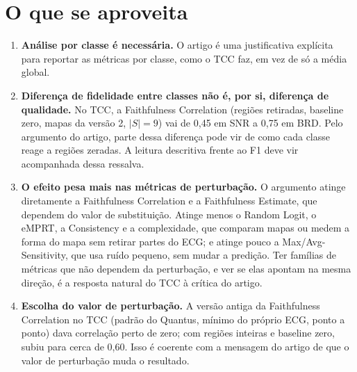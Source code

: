 \documentclass[11pt,a4paper]{article}
\begin{document}
\section{O que se aproveita}
\begin{enumerate}
\item \textbf{Análise por classe é necessária.} O artigo é uma justificativa explícita para reportar as métricas por classe, como o TCC faz, em vez de só a média global.
\item \textbf{Diferença de fidelidade entre classes não é, por si, diferença de qualidade.} No TCC, a Faithfulness Correlation (regiões retiradas, baseline zero, mapas da versão 2, $|S| = 9$) vai de 0,45 em SNR a 0,75 em BRD. Pelo argumento do artigo, parte dessa diferença pode vir de como cada classe reage a regiões zeradas. A leitura descritiva frente ao F1 deve vir acompanhada dessa ressalva.
\item \textbf{O efeito pesa mais nas métricas de perturbação.} O argumento atinge diretamente a Faithfulness Correlation e a Faithfulness Estimate, que dependem do valor de substituição. Atinge menos o Random Logit, o eMPRT, a Consistency e a complexidade, que comparam mapas ou medem a forma do mapa sem retirar partes do ECG; e atinge pouco a Max/Avg-Sensitivity, que usa ruído pequeno, sem mudar a predição. Ter famílias de métricas que não dependem da perturbação, e ver se elas apontam na mesma direção, é a resposta natural do TCC à crítica do artigo.
\item \textbf{Escolha do valor de perturbação.} A versão antiga da Faithfulness Correlation no TCC (padrão do Quantus, mínimo do próprio ECG, ponto a ponto) dava correlação perto de zero; com regiões inteiras e baseline zero, subiu para cerca de 0,60. Isso é coerente com a mensagem do artigo de que o valor de perturbação muda o resultado.
\end{enumerate}
\end{document}
